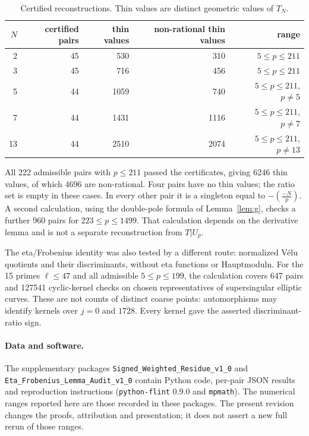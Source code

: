 \documentclass[11pt,a4paper]{article}
\numberwithin{equation}{section}
\theoremstyle{definition}
\theoremstyle{remark}
\begin{document}
\begin{table}[ht]\centering
\begin{tabular}{rrrrr}\toprule
$N$ & certified pairs & thin values & non-rational thin values & range\\\midrule
2 & 45 & 530 & 310 & $5\le p\le211$\\
3 & 45 & 716 & 456 & $5\le p\le211$\\
5 & 44 & 1059 & 740 & $5\le p\le211$, $p\ne5$\\
7 & 44 & 1431 & 1116 & $5\le p\le211$, $p\ne7$\\
13 & 44 & 2510 & 2074 & $5\le p\le211$, $p\ne13$\\\bottomrule
\end{tabular}
\caption{Certified reconstructions. Thin values are distinct geometric values of $T_N$.}
\end{table}

All 222 admissible pairs with $p\le211$ passed the certificates, giving 6246 thin
values, of which 4696 are non-rational. Four pairs have no thin values; the ratio
set is empty in these cases. In every other pair it is a singleton equal to
$-\left(\frac{-N}{p}\right)$. A second calculation, using the double-pole formula
of Lemma~\ref{lem:g}, checks a further 960 pairs for $223\le p\le1499$.
That calculation depends on the derivative lemma and is not a separate
reconstruction from $T|U_p$.

The eta/Frobenius identity was also tested by a different route: normalized
V\'elu quotients and their discriminants, without eta functions or Hauptmoduln.
For the 15 primes $\ell\le47$ and all admissible $5\le p\le199$, the calculation
covers 647 pairs and 127541 cyclic-kernel checks on chosen representatives of
supersingular elliptic curves. These are not counts of distinct coarse points:
automorphisms may identify kernels over $j=0$ and $1728$.
Every kernel gave the asserted discriminant-ratio sign.

\paragraph{Data and software.}
The supplementary packages \texttt{Signed\_Weighted\_Residue\_v1\_0} and
\texttt{Eta\_Frobenius\_Lemma\_Audit\_v1\_0} contain Python code, per-pair JSON
results and reproduction instructions (\texttt{python-flint} 0.9.0 and
\texttt{mpmath}). The numerical ranges reported here are those recorded in these
packages. The present revision changes the proofs, attribution and presentation;
it does not assert a new full rerun of those ranges.
\end{document}
